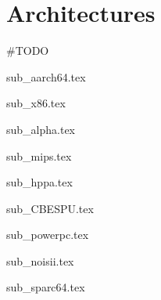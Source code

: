 \section{Architectures}

\#TODO

{sub_aarch64.tex}

{sub_x86.tex}

{sub_alpha.tex}

{sub_mips.tex}

{sub_hppa.tex}

{sub_CBESPU.tex}

{sub_powerpc.tex}

{sub_noisii.tex}

{sub_sparc64.tex}
